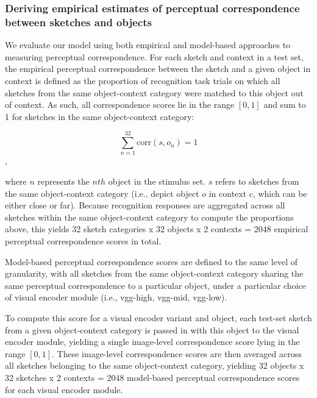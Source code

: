 \documentclass[9pt,twocolumn,twoside]{pnas-new}
\begin{document}
{%





\subsubsection*{Deriving empirical estimates of perceptual correspondence between sketches and objects}

We evaluate our model using both empirical and model-based approaches to measuring perceptual correspondence. For each sketch and context in a test set, the empirical perceptual correspondence between the sketch and a given object in context is defined as the proportion of recognition task trials on which all sketches from the same object-context category were matched to this object out of context. As such, all correspondence scores lie in the range $[0,1]$ and sum to 1 for sketches in the same object-context category:

$$\sum_{n=1}^{32} \textrm{corr} (s,o_{n}) = 1 $$,

where $n$ represents the $nth$ object in the stimulus set. $s$ refers to sketches from the same object-context category (i.e., depict object $o$ in context $c$, which can be either close or far). Because recognition responses are aggregated across all sketches within the same object-context category to compute the proportions above, this yields 32 sketch categories x 32 objects x 2 contexts = 2048 empirical perceptual correspondence scores in total.

Model-based perceptual correspondence scores are defined to the same level of granularity, with all sketches from the same object-context category sharing the same perceptual correspondence to a particular object, under a particular choice of visual encoder module (i.e., vgg-high, vgg-mid, vgg-low).

To compute this score for a visual encoder variant and object, each test-set sketch from a given object-context category is passed in with this object to the visual encoder module, yielding a single image-level correspondence score lying in the range $[0,1]$. These image-level correspondence scores are then averaged across all sketches belonging to the same object-context category, yielding 32 objects x 32 sketches x 2 contexts  = 2048 model-based perceptual correspondence scores for each visual encoder module.

}
\end{document}
